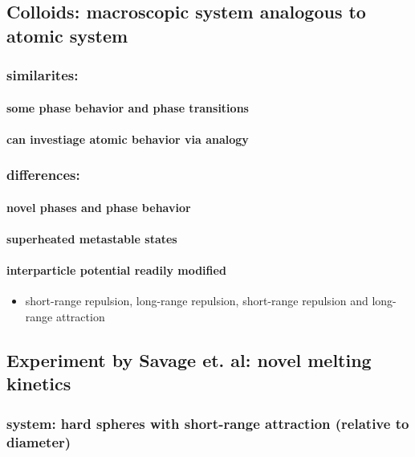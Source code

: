 \documentclass{umthesis}
\begin{document}
\subsection{Colloids: macroscopic system analogous to atomic system}
\label{sec-2.1.1}
\subsubsection{similarites:}
\label{sec-2.1.1.1}
\paragraph{some phase behavior and phase transitions}
\label{sec-2.1.1.1.1}
\paragraph{can investiage atomic behavior via analogy}
\label{sec-2.1.1.1.2}
\subsubsection{differences:}
\label{sec-2.1.1.2}
\paragraph{novel phases and phase behavior}
\label{sec-2.1.1.2.1}
\paragraph{superheated metastable states}
\label{sec-2.1.1.2.2}
\paragraph{interparticle potential readily modified}
\label{sec-2.1.1.2.3}
\begin{itemize}

\item short-range repulsion, long-range repulsion, short-range repulsion and long-range attraction\\
\label{sec-2.1.1.2.3.1}%
\end{itemize} %
\subsection{Experiment by Savage et. al: novel melting kinetics}
\label{sec-2.1.2}
\subsubsection{system: hard spheres with short-range attraction (relative to diameter)}
\label{sec-2.1.2.1}
\end{document}
